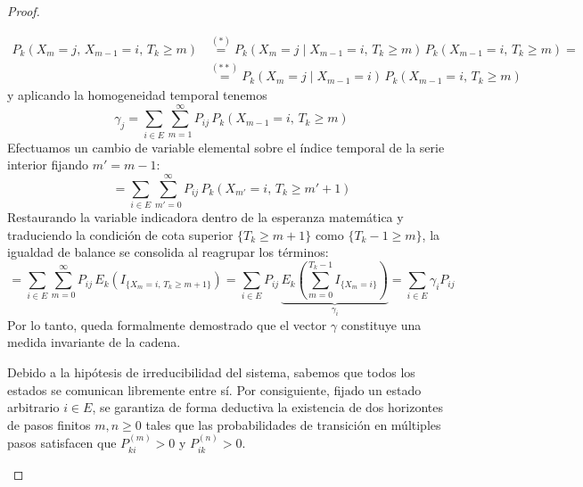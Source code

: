 \documentclass[10pt]{book}
\begin{document}
\begin{teo}
\begin{proof}
\begin{description}
            \begin{align*}
                P_k (X_m = j, \, X_{m-1} = i, \, T_k \geq m) &\overset{(*)}{=} P_k (X_m = j \mid X_{m-1} = i, \, T_k \geq m) \, P_k (X_{m-1} = i, \, T_k \geq m) =\\
                &\overset{(**)}{=} P_k (X_m = j \mid X_{m-1} = i) \, P_k (X_{m-1} = i, \, T_k \geq m)
            \end{align*}
            y aplicando la homogeneidad temporal tenemos
            \[
            \gamma_j=\sum_{i \in E} \sum_{m=1}^{\infty} P_{ij} \, P_k (X_{m-1} = i, \, T_k \geq m)
            \]
            Efectuamos un cambio de variable elemental sobre el índice temporal de la serie interior fijando $m' = m - 1$:
            \[
            = \sum_{i \in E} \sum_{m'=0}^{\infty} P_{ij} \, P_k (X_{m'} = i, \, T_k \geq m' + 1)
            \]
            Restaurando la variable indicadora dentro de la esperanza matemática y traduciendo la condición de cota superior $\{T_k \geq m + 1\}$ como $\{T_k - 1 \geq m\}$, la igualdad de balance se consolida al reagrupar los términos:
            \[
            = \sum_{i \in E} \sum_{m=0}^{\infty} P_{ij} \, E_k \left( I_{\{X_m = i, \, T_k \geq m + 1\}} \right) 
            = \sum_{i \in E} P_{ij} \, \underbrace{E_k \left( \sum_{m=0}^{T_k - 1} I_{\{X_m = i\}} \right)}_{\gamma_i} 
            = \sum_{i \in E} \gamma_i P_{ij}
            \]
            Por lo tanto, queda formalmente demostrado que el vector $\gamma$ constituye una medida invariante de la cadena.
        \item[$(2)$] Debido a la hipótesis de irreducibilidad del sistema, sabemos que todos los estados se comunican libremente entre sí. Por consiguiente, fijado un estado arbitrario $i \in E$, se garantiza de forma deductiva la existencia de dos horizontes de pasos finitos $m, n \geq 0$ tales que las probabilidades de transición en múltiples pasos satisfacen que $P_{ki}^{(m)} > 0$ y $P_{ik}^{(n)} > 0$.


\end{description}
\end{proof}
\end{teo}
\end{document}
